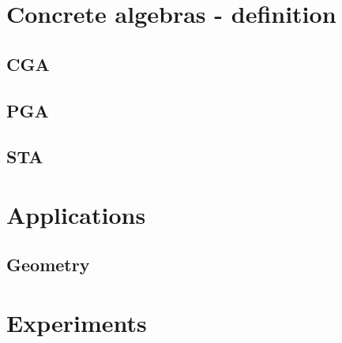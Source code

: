 \section{Concrete algebras - definition}

\subsection{CGA}

\subsection{PGA}

\subsection{STA}

\section{Applications}

\subsection{Geometry}

\section{Experiments}



\ifplastex
\else

\fi

